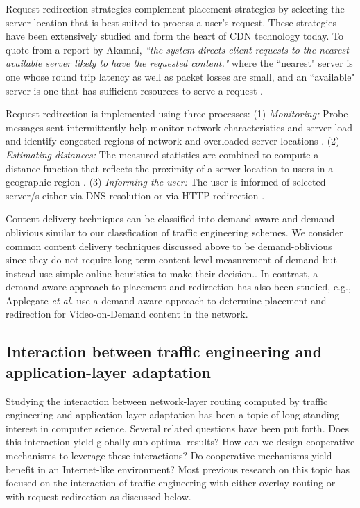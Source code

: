 Request redirection strategies complement placement strategies by selecting the server location that is best suited to process a user's request. These strategies have been extensively studied and form the heart of CDN technology today. To quote from a report by Akamai,  \emph{``the system directs client requests to the nearest available server likely to have the requested content."} where the ``nearest" server is one whose round trip latency as well as packet losses are small, and  an ``available" server is one that has sufficient resources to serve a request \cite{DilleyMPPSW02}. 

Request redirection is implemented using three processes: (1) \emph{Monitoring:} Probe messages sent intermittently help monitor network characteristics and server load and identify congested regions of network and overloaded server locations \cite{oasis,donar}. (2) \emph{Estimating distances:} The measured statistics are combined to compute a distance function that reflects the proximity of a server location to users in a geographic region \cite{donar}. (3) \emph{Informing the user:} The user is informed of selected server/s either via DNS resolution \cite{DilleyMPPSW02} or via HTTP redirection \cite{barbir2003known}.

Content delivery techniques can be classified into demand-aware and demand-oblivious similar to our classfication of traffic engineering schemes. We consider common content delivery techniques discussed above to be demand-oblivious since they do not require long term content-level measurement of demand but instead use simple online heuristics to make their decision.. In contrast, a demand-aware approach to  placement and redirection has also been studied, e.g., Applegate \emph{et al.} use a demand-aware approach to determine placement and redirection for Video-on-Demand content in the network. 

\subsection{Interaction between traffic engineering and application-layer adaptation}
\label{sec:ch2-te-cdn}

Studying the interaction between network-layer routing computed by traffic engineering and application-layer adaptation has been a topic of long standing interest in computer science. Several related questions have been put forth. Does this interaction yield globally sub-optimal results? How can we design cooperative mechanisms to leverage these interactions? Do cooperative mechanisms yield benefit in an Internet-like environment? Most previous research on this topic has focused on the interaction of traffic engineering with either overlay routing \cite{Roughgarden,selfishQiu} or with request redirection \cite{Jiang2009,JohariGameTheory, CATE, P4P} as discussed below. 

